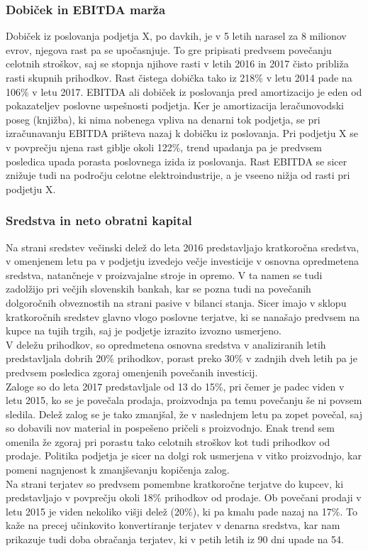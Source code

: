 \documentclass[12pt,a4paper]{amsart}
\theoremstyle{definition} %
\theoremstyle{plain} %
\begin{document}
\subsubsection{Dobiček in EBITDA marža}
Dobiček iz poslovanja podjetja X, po davkih, je v 5 letih narasel za 8 milionov evrov, njegova rast pa se upočasnjuje. To gre pripisati predvsem povečanju celotnih stroškov, saj se stopnja njihove rasti v letih 2016 in 2017 čisto približa rasti skupnih prihodkov. Rast čistega dobička tako iz 218\% v letu 2014 pade na 106\% v letu 2017.
EBITDA ali dobiček iz poslovanja pred amortizacijo je eden od pokazateljev poslovne uspešnosti podjetja. Ker je amortizacija leračunovodski poseg (knjižba), ki nima nobenega vpliva na denarni tok podjetja, se pri izračunavanju EBITDA prišteva nazaj k dobičku iz poslovanja. Pri podjetju X se v povprečju njena rast giblje okoli 122\%, trend upadanja pa je predvsem posledica upada porasta poslovnega izida iz poslovanja. Rast EBITDA se sicer znižuje tudi na področju celotne elektroindustrije, a je vseeno nižja od rasti pri podjetju X.


\subsubsection{Sredstva in neto obratni kapital}
Na strani sredstev večinski delež do leta 2016 predstavljajo kratkoročna sredstva, v omenjenem letu pa v podjetju izvedejo večje investicije v osnovna opredmetena sredstva, natančneje v proizvajalne stroje in opremo. V ta namen se tudi zadolžijo pri večjih slovenskih bankah, kar se pozna tudi na povečanih dolgoročnih obveznostih na strani pasive v bilanci stanja. Sicer imajo v sklopu kratkoročnih sredstev glavno vlogo poslovne terjatve, ki se nanašajo predvsem na kupce na tujih trgih, saj je podjetje izrazito izvozno usmerjeno. \\
V deležu prihodkov, so opredmetena osnovna sredstva v analiziranih letih predstavljala dobrih 20\% prihodkov, porast preko 30\% v zadnjih dveh letih pa je predvsem posledica zgoraj omenjenih povečanih investicij.\\
Zaloge so do leta 2017 predstavljale od 13 do 15\%, pri čemer je padec viden v letu 2015, ko se je povečala prodaja, proizvodnja pa temu povečanju še ni povsem sledila. Delež zalog se je tako zmanjšal, že v naslednjem letu pa zopet povečal, saj so dobavili nov material in pospešeno pričeli s proizvodnjo. Enak trend sem omenila že zgoraj pri porastu tako celotnih stroškov kot tudi prihodkov od prodaje. Politika podjetja je sicer na dolgi rok usmerjena v vitko proizvodnjo, kar pomeni nagnjenost k zmanjševanju kopičenja zalog.  \\
Na strani terjatev so predvsem pomembne kratkoročne terjatve do kupcev, ki predstavljajo v povprečju okoli 18\% prihodkov od prodaje. Ob povečani prodaji v letu 2015 je viden nekoliko višji delež (20\%), ki pa kmalu pade nazaj na 17\%. To kaže na precej učinkovito konvertiranje terjatev v denarna sredstva, kar nam prikazuje tudi doba obračanja terjatev, ki v petih letih iz 90 dni upade na 54. \\
\end{document}
